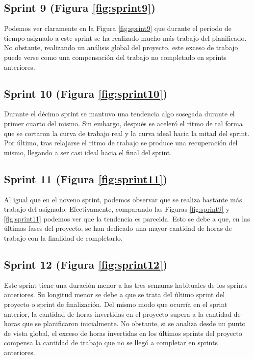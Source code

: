 \subsection{Sprint 9 (Figura \ref{fig:sprint9})}

Podemos ver claramente en la Figura \ref{fig:sprint9} que durante el periodo de tiempo asignado a este sprint se ha realizado mucho más trabajo del planificado. No obstante, realizando un análisis global del proyecto, este exceso de trabajo puede verse como una compensación del trabajo no completado en sprints anteriores.

\subsection{Sprint 10 (Figura \ref{fig:sprint10})}

Durante el décimo sprint se mantuvo una tendencia algo sosegada durante el primer cuarto del mismo. Sin embargo, después se aceleró el ritmo de tal forma que se cortaron la curva de trabajo real y la curva ideal hacia la mitad del sprint. Por último, tras relajarse el ritmo de trabajo se produce una recuperación del mismo, llegando a ser casi ideal hacia el final del sprint.

\subsection{Sprint 11 (Figura \ref{fig:sprint11})}

Al igual que en el noveno sprint, podemos observar que se realiza bastante más trabajo del asignado. Efectivamente, comparando las Figuras \ref{fig:sprint9} y \ref{fig:sprint11} podemos ver que la tendencia es parecida. Esto se debe a que, en las últimas fases del proyecto, se han dedicado una mayor cantidad de horas de trabajo con la finalidad de completarlo.

\subsection{Sprint 12 (Figura \ref{fig:sprint12})}

Este sprint tiene una duración menor a las tres semanas habituales de los sprints anteriores. Su longitud menor se debe a que se trata del último sprint del proyecto o sprint de finalización. Del mismo modo que ocurría en el sprint anterior, la cantidad de horas invertidas en el proyecto supera a la cantidad de horas que se planificaron inicialmente. No obstante, si se analiza desde un punto de vista global, el exceso de horas invertidas en los últimos sprints del proyecto compensa la cantidad de trabajo que no se llegó a completar en sprints anteriores.


